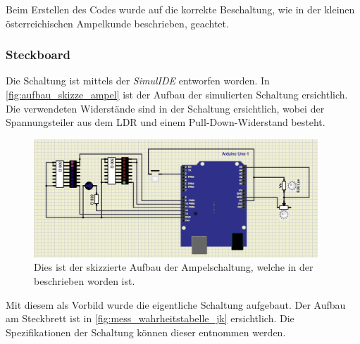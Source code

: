 \documentclass[12pt,english,ngerman]{scrartcl}
\begin{document}
Beim Erstellen des Codes wurde auf die korrekte Beschaltung, wie in der
kleinen österreichischen Ampelkunde beschrieben, geachtet.

\subsubsection{Steckboard}

Die Schaltung ist mittels der \textit{SimulIDE} entworfen worden. In \autoref{fig:aufbau_skizze_ampel} 
ist der Aufbau der simulierten Schaltung ersichtlich. Die verwendeten
Widerstände sind in der Schaltung ersichtlich, wobei der Spannungsteiler
aus dem LDR und einem Pull-Down-Widerstand besteht.
\begin{figure}[H]
  \centering
 \includegraphics[width=0.95\textwidth]{./figures/messungen/aufbau_ampel.png}
  \caption{Dies ist der skizzierte Aufbau der Ampelschaltung, welche in der  beschrieben worden ist. }
  \label{fig:aufbau_skizze_ampel}
\end{figure}

Mit diesem als Vorbild wurde die eigentliche Schaltung aufgebaut.
Der Aufbau am Steckbrett ist in \autoref{fig:mess_wahrheitstabelle_jk} ersichtlich.
Die Spezifikationen der Schaltung können dieser entnommen werden.
\end{document}
